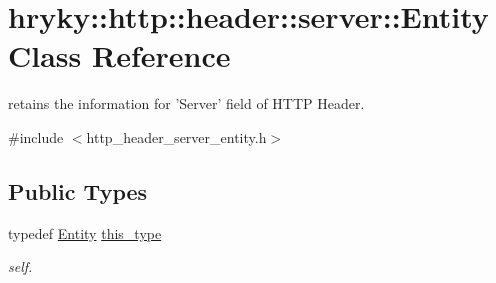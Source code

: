 \hypertarget{classhryky_1_1http_1_1header_1_1server_1_1_entity}{\section{hryky\-:\-:http\-:\-:header\-:\-:server\-:\-:Entity Class Reference}
\label{classhryky_1_1http_1_1header_1_1server_1_1_entity}
}


retains the information for 'Server' field of H\-T\-T\-P Header.  




{\ttfamily \#include $<$http\-\_\-header\-\_\-server\-\_\-entity.\-h$>$}

\subsection*{Public Types}
\begin{DoxyCompactItemize}
\item 
\hypertarget{classhryky_1_1http_1_1header_1_1server_1_1_entity_a0009d4111326ee03ac700834367f90fa}{typedef \hyperlink{classhryky_1_1http_1_1header_1_1server_1_1_entity}{Entity} \hyperlink{classhryky_1_1http_1_1header_1_1server_1_1_entity_a0009d4111326ee03ac700834367f90fa}{this\-\_\-type}}\label{classhryky_1_1http_1_1header_1_1server_1_1_entity_a0009d4111326ee03ac700834367f90fa}

\begin{DoxyCompactList}\small\item\em self. \end{DoxyCompactList}\end{DoxyCompactItemize}
